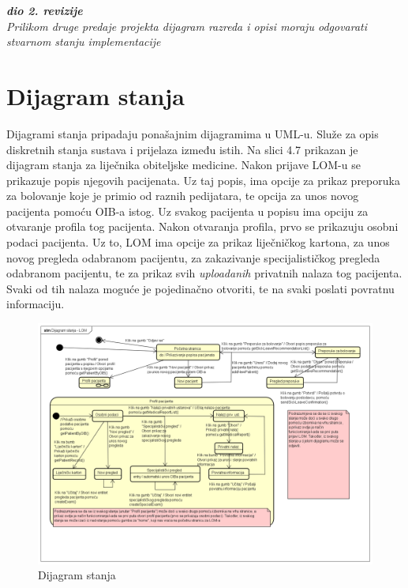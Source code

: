 			\textbf{\textit{dio 2. revizije}}\\			
			
			\textit{Prilikom druge predaje projekta dijagram razreda i opisi moraju odgovarati stvarnom stanju implementacije}
			
			
			
			\eject
		
		\section{Dijagram stanja}
			
			\text Dijagrami stanja pripadaju ponašajnim dijagramima u UML-u. Služe za opis diskretnih stanja sustava i prijelaza između istih. Na slici 4.7 prikazan je dijagram stanja za liječnika obiteljske medicine. Nakon prijave LOM-u se prikazuje popis njegovih pacijenata. Uz taj popis, ima opcije za prikaz preporuka za bolovanje koje je primio od raznih pedijatara, te opcija za unos novog pacijenta pomoću OIB-a istog. Uz svakog pacijenta u popisu ima opciju za otvaranje profila tog pacijenta. Nakon otvaranja profila, prvo se prikazuju osobni podaci pacijenta. Uz to, LOM ima opcije za prikaz liječničkog kartona, za unos novog pregleda odabranom pacijentu, za zakazivanje specijalističkog pregleda odabranom pacijentu, te za prikaz svih \textit{uploadanih} privatnih nalaza tog pacijenta. Svaki od tih nalaza moguće je pojedinačno otvoriti, te na svaki poslati povratnu informaciju. 
			
			\begin{figure}[H]
				\includegraphics[scale=0.4]{dijagrami/dijstanj1.PNG} %
				\centering
				\caption{Dijagram stanja}
				\label{fig:dijstanj1}
			\end{figure}
			
